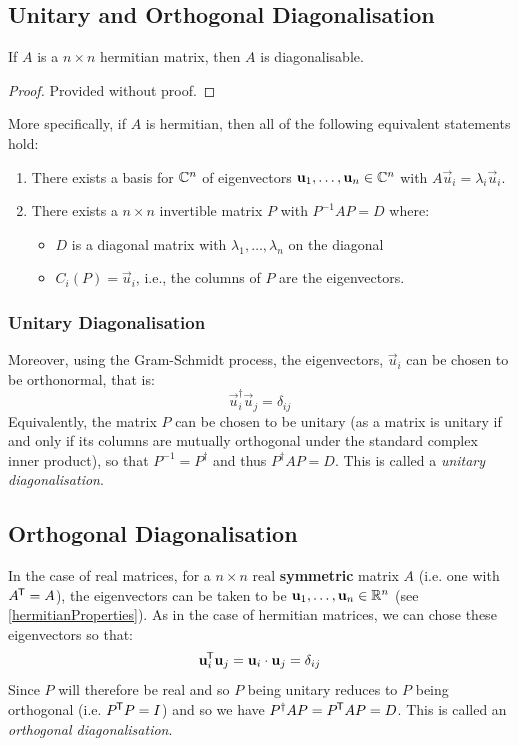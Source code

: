 \documentclass[../main.tex]{subfiles}
\begin{document}
\subsection{Unitary and Orthogonal Diagonalisation}
\begin{theorem}
  If $A$ is a $n \times n$ hermitian matrix, then $A$ is diagonalisable.
\end{theorem}
\begin{proof}
  Provided without proof.
\end{proof}
More specifically, if $A$ is hermitian, then all of the following equivalent statements hold:
\begin{enumerate}
  \item There exists a basis for $\mathbb{C}^{n}$ of eigenvectors $\mathbf{\bm{u}}_1, \ldots, \mathbf{\bm{u}}_n \in \mathbb{C}^{n}$ with $A \vec{u}_i = \lambda_i \vec{u}_i$.
  \item There exists a $n \times n$ invertible matrix $P$ with $P^{-1}AP = D$ where:
    \begin{itemize}
      \item $D$ is a diagonal matrix with $\lambda_1, \ldots, \lambda_n$ on the diagonal
      \item $C_i(P) = \vec{u}_i$, i.e., the columns of $P$ are the eigenvectors.
    \end{itemize}
\end{enumerate}
\subsubsection{Unitary Diagonalisation}
Moreover, using the Gram-Schmidt process, the eigenvectors, $\vec{u}_i$ can be chosen to be orthonormal, that is:
\[
  \vec{u}^{\dag}_{i}\vec{u}_j = \delta_{i j}
\]
Equivalently, the matrix $P$ can be chosen to be unitary (as a matrix is unitary if and only if its columns are mutually orthogonal under the standard complex inner product), so that $P^{-1} = P^{\dag}$ and thus $P^{\dag} A P = D$.
This is called a \textit{unitary diagonalisation}.
\subsection{Orthogonal Diagonalisation}
In the case of real matrices, for a $n \times n$ real \textbf{symmetric} matrix $A$ (i.e. one with $A^{{\mkern-1.5mu\mathsf{T}}} = A$), the eigenvectors can be taken to be $\mathbf{\bm{u}}_1, \ldots, \mathbf{\bm{u}}_n \in \mathbb{R}^{n}$ (see \cref{hermitianProperties}).
As in the case of hermitian matrices, we can chose these eigenvectors so that:
\[
  \mathbf{\bm{u}}^{{\mkern-1.5mu\mathsf{T}}}_{i} \mathbf{\bm{u}}_j = \mathbf{\bm{u}}_i \cdot \mathbf{\bm{u}}_j= \delta_{i j}
\]
Since $P$ will therefore be real and so $P$ being unitary reduces to $P$ being orthogonal (i.e. $P^{{\mkern-1.5mu\mathsf{T}}} P = I$) and so we have $P^{\dag} A P = P^{{\mkern-1.5mu\mathsf{T}}} A P = D$.
This is called an \textit{orthogonal diagonalisation}.
\end{document}

